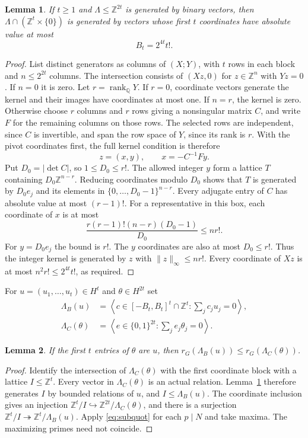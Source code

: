\documentclass[11pt]{amsart}
\newtheorem{lemma}{Lemma}
\theoremstyle{remark}
\newcommand{\Z}{\mathbb Z}
\newcommand{\Q}{\mathbb Q}
\newcommand{\LB}{\Lambda_B}
\newcommand{\LC}{\Lambda_C}
\begin{document}
\begin{lemma}\label{lem:intersection}
If $t\ge1$ and $\Lambda\le\Z^{2t}$ is generated by binary vectors,
then $\Lambda\cap(\Z^t\times\{0\})$ is generated by vectors whose
first $t$ coordinates have absolute value at most
\begin{equation}\label{eq:box}
 B_t=2^{4t}t!.
\end{equation}
\end{lemma}
\begin{proof}
List distinct generators as columns of $(X;Y)$, with $t$ rows in each
block and $n\le2^{2t}$ columns. The intersection consists of $(Xz,0)$
for $z\in\Z^n$ with $Yz=0$. If $n=0$ it is zero. Let
$r=\operatorname{rank}_{\Q}Y$. If $r=0$, coordinate vectors generate
the kernel and their images have coordinates at most one. If $n=r$,
the kernel is zero. Otherwise choose $r$ columns and $r$ rows giving
a nonsingular matrix $C$, and write $F$ for the remaining columns on
those rows. The selected rows are independent, since $C$ is invertible,
and span the row space of $Y$, since its rank is $r$. With the pivot
coordinates first, the full kernel condition is therefore
\[
 z=(x,y),\qquad x=-C^{-1}Fy.
\]
Put $D_0=|\det C|$, so $1\le D_0\le r!$. The allowed integer $y$
form a lattice $T$ containing $D_0\Z^{n-r}$. Reducing coordinates
modulo $D_0$ shows that $T$ is generated by $D_0e_j$ and its elements
in $\{0,\ldots,D_0-1\}^{n-r}$. Every adjugate entry of $C$ has
absolute value at most $(r-1)!$. For a representative in this box,
each coordinate of $x$ is at most
\[
 \frac{r(r-1)!(n-r)(D_0-1)}{D_0}\le nr!.
\]
For $y=D_0e_j$ the bound is $r!$. The $y$ coordinates are also at
most $D_0\le r!$. Thus the integer kernel is generated by $z$ with
$\|z\|_\infty\le nr!$. Every coordinate of $Xz$ is at most
$n^2r!\le2^{4t}t!$, as required.
\end{proof}

For $u=(u_1,\ldots,u_t)\in H^t$ and $\theta\in H^{2t}$ set
\begin{align*}
 \LB(u)&=\left\langle c\in[-B_t,B_t]^t\cap\Z^t:
                         \sum_jc_ju_j=0\right\rangle,\\
 \LC(\theta)&=\left\langle e\in\{0,1\}^{2t}:
                         \sum_je_j\theta_j=0\right\rangle.
\end{align*}
\begin{lemma}\label{lem:persist}
If the first $t$ entries of $\theta$ are $u$, then
$r_G(\LB(u))\le r_G(\LC(\theta))$.
\end{lemma}
\begin{proof}
Identify the intersection of $\LC(\theta)$ with the first coordinate
block with a lattice $I\le\Z^t$. Every vector in $\LC(\theta)$ is
an actual relation. Lemma~\ref{lem:intersection} therefore generates
$I$ by bounded relations of $u$, and $I\le\LB(u)$. The coordinate
inclusion gives an injection
$\Z^t/I\hookrightarrow\Z^{2t}/\LC(\theta)$, and there is a
surjection $\Z^t/I\twoheadrightarrow\Z^t/\LB(u)$. Apply
\eqref{eq:subquot} for each $p\mid N$ and take maxima. The maximizing
primes need not coincide.
\end{proof}
\end{document}

